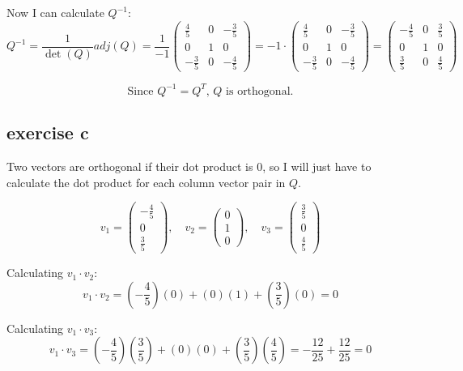 \documentclass[11pt, a4paper]{article}
\begin{document}
Now I can calculate $Q^{-1}$:
\[Q^{-1} = \frac{1}{\det(Q)} adj(Q)
= \frac{1}{-1} \begin{pmatrix}
	\frac{4}{5} & 0 & -\frac{3}{5} \\
	0 & 1 & 0 \\
	-\frac{3}{5} & 0 & -\frac{4}{5}
\end{pmatrix} = -1 \cdot \begin{pmatrix}
	\frac{4}{5} & 0 & -\frac{3}{5} \\
	0 & 1 & 0 \\
	-\frac{3}{5} & 0 & -\frac{4}{5}
\end{pmatrix} =
\begin{pmatrix}
	-\frac{4}{5} & 0 & \frac{3}{5} \\
	0 & 1 & 0 \\
	\frac{3}{5} & 0 & \frac{4}{5}
\end{pmatrix}
\]

\[
\boxed{
	\text{Since $Q^{-1} = Q^T$, $Q$ is orthogonal.}
}
\]




\subsection*{exercise c}

Two vectors are orthogonal if their dot product is 0, so I will just have to calculate the dot product for each column vector pair in $Q$.

\[
v_1 = \begin{pmatrix}
	-\frac{4}{5} \\
	0 \\
	\frac{3}{5}
\end{pmatrix}, \quad
v_2 = \begin{pmatrix}
	0 \\
	1 \\
	0
\end{pmatrix}, \quad
v_3 = \begin{pmatrix}
	\frac{3}{5} \\
	0 \\
	\frac{4}{5}
\end{pmatrix}
\]

Calculating $v_1 \cdot v_2$:
\[
v_1 \cdot v_2 = \left(-\frac{4}{5}\right)(0) + (0)(1) + \left(\frac{3}{5}\right)(0) = 0
\]

Calculating $v_1 \cdot v_3$:
\[
v_1 \cdot v_3 = \left(-\frac{4}{5}\right)\left(\frac{3}{5}\right) + (0)(0) + \left(\frac{3}{5}\right)\left(\frac{4}{5}\right) = -\frac{12}{25} + \frac{12}{25} = 0
\]
\end{document}
